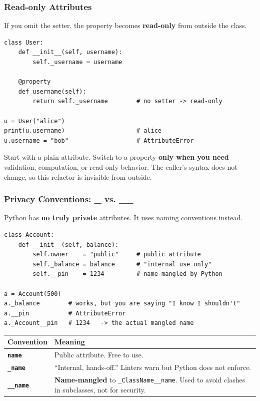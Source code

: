 \documentclass[aspectratio=169,10pt]{beamer}
\newcommand{\keyword}[1]{\textcolor{PrimaryBlue}{\textbf{#1}}}
\newcommand{\codeword}[1]{\texttt{#1}}
\newcommand{\code}[1]{\texttt{#1}}
\begin{document}
\begin{frame}[fragile]
\frametitle{Read-only Attributes}
\small
If you omit the setter, the property becomes \keyword{read-only} from outside the class.

\vspace{0.15cm}
\begin{lstlisting}[style=pycode]
class User:
    def __init__(self, username):
        self._username = username

    @property
    def username(self):
        return self._username        # no setter -> read-only

u = User("alice")
print(u.username)                    # alice
u.username = "bob"                   # AttributeError
\end{lstlisting}

\begin{tcolorbox}[lecturebox,title=Pythonic principle]
Start with a plain attribute. Switch to a property \keyword{only when you need} validation, computation, or read-only behavior. The caller's syntax does not change, so this refactor is invisible from outside.
\end{tcolorbox}
\end{frame}


\begin{frame}[fragile]
\frametitle{Privacy Conventions: \_ vs. \_\_}
\small
Python has \keyword{no truly private} attributes. It uses naming conventions instead.

\vspace{0.12cm}
\begin{lstlisting}[style=pycode]
class Account:
    def __init__(self, balance):
        self.owner    = "public"     # public attribute
        self._balance = balance      # "internal use only"
        self.__pin    = 1234         # name-mangled by Python

a = Account(500)
a._balance        # works, but you are saying "I know I shouldn't"
a.__pin           # AttributeError
a._Account__pin   # 1234   -> the actual mangled name
\end{lstlisting}

\renewcommand{\arraystretch}{1.25}
\begin{tabularx}{\linewidth}{>{\bfseries}p{2.0cm}X}
\toprule
Convention & Meaning \\
\midrule
\code{name}        & Public attribute. Free to use. \\
\code{\_name}      & ``Internal, hands-off.'' Linters warn but Python does not enforce. \\
\code{\_\_name}    & \keyword{Name-mangled} to \codeword{\_ClassName\_\_name}. Used to avoid clashes in subclasses, not for security. \\
\bottomrule
\end{tabularx}
\end{frame}
\end{document}
